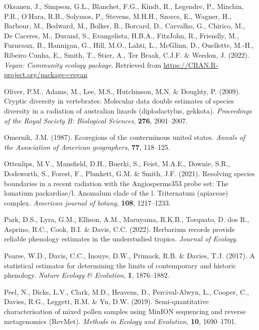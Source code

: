 \documentclass[
]{article}
\newlength{\cslhangindent}
\newlength{\cslentryspacingunit} %
\newenvironment{CSLReferences}[2] %
 {%
  \setlength{\parindent}{0pt}
  \ifodd #1
  \let\oldpar\par
  \def\par{\hangindent=\cslhangindent\oldpar}
  \fi
  \setlength{\parskip}{#2\cslentryspacingunit}
 }%
 {}
\begin{document}
\begin{CSLReferences}{1}{0}
\leavevmode{}%
Oksanen, J., Simpson, G.L., Blanchet, F.G., Kindt, R., Legendre, P.,
Minchin, P.R., O'Hara, R.B., Solymos, P., Stevens, M.H.H., Szoecs, E.,
Wagner, H., Barbour, M., Bedward, M., Bolker, B., Borcard, D., Carvalho,
G., Chirico, M., De Caceres, M., Durand, S., Evangelista, H.B.A.,
FitzJohn, R., Friendly, M., Furneaux, B., Hannigan, G., Hill, M.O.,
Lahti, L., McGlinn, D., Ouellette, M.-H., Ribeiro Cunha, E., Smith, T.,
Stier, A., Ter Braak, C.J.F. \& Weedon, J. (2022). \emph{Vegan:
Community ecology package}. Retrieved from
\url{https://CRAN.R-project.org/package=vegan}

\leavevmode{}%
Oliver, P.M., Adams, M., Lee, M.S., Hutchinson, M.N. \& Doughty, P.
(2009). Cryptic diversity in vertebrates: Molecular data double
estimates of species diversity in a radiation of australian lizards
(diplodactylus, gekkota). \emph{Proceedings of the Royal Society B:
Biological Sciences}, \textbf{276}, 2001--2007.

\leavevmode{}%
Omernik, J.M. (1987). Ecoregions of the conterminous united states.
\emph{Annals of the Association of American geographers}, \textbf{77},
118--125.

\leavevmode{}%
Ottenlips, M.V., Mansfield, D.H., Buerki, S., Feist, M.A.E., Downie,
S.R., Dodsworth, S., Forest, F., Plunkett, G.M. \& Smith, J.F. (2021).
Resolving species boundaries in a recent radiation with the
Angiosperms353 probe set: The lomatium packardiae/l. Anomalum clade of
the l. Triternatum (apiaceae) complex. \emph{American journal of
botany}, \textbf{108}, 1217--1233.

\leavevmode{}%
Park, D.S., Lyra, G.M., Ellison, A.M., Maruyama, R.K.B., Torquato, D.
dos R., Asprino, R.C., Cook, B.I. \& Davis, C.C. (2022). Herbarium
records provide reliable phenology estimates in the understudied
tropics. \emph{Journal of Ecology}.

\leavevmode{}%
Pearse, W.D., Davis, C.C., Inouye, D.W., Primack, R.B. \& Davies, T.J.
(2017). A statistical estimator for determining the limits of
contemporary and historic phenology. \emph{Nature Ecology \& Evolution},
\textbf{1}, 1876--1882.

\leavevmode{}%
Peel, N., Dicks, L.V., Clark, M.D., Heavens, D., Percival-Alwyn, L.,
Cooper, C., Davies, R.G., Leggett, R.M. \& Yu, D.W. (2019).
Semi-quantitative characterisation of mixed pollen samples using MinION
sequencing and reverse metagenomics (RevMet). \emph{Methods in Ecology
and Evolution}, \textbf{10}, 1690--1701.


\end{CSLReferences}
\end{document}
